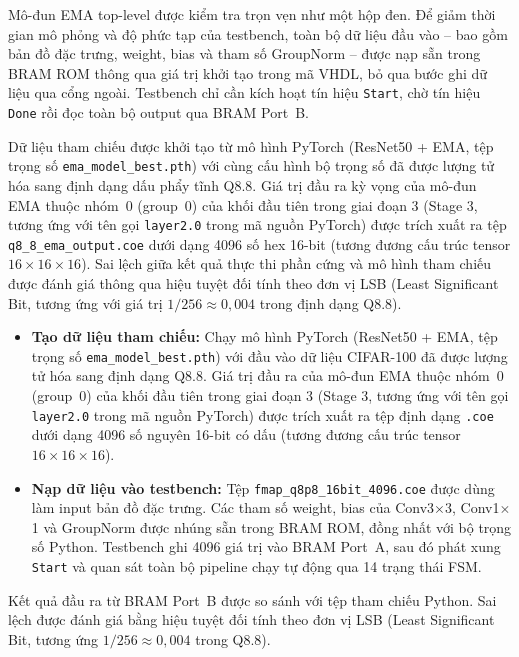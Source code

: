 \documentclass{uetgraduation}
\begin{document}
Mô-đun EMA top-level được kiểm tra trọn vẹn như một hộp đen. Để giảm thời gian
mô phỏng và độ phức tạp của testbench, toàn bộ dữ liệu đầu vào -- bao gồm
bản đồ đặc trưng, weight, bias và tham số GroupNorm -- được nạp sẵn trong BRAM ROM
thông qua giá trị khởi tạo trong mã VHDL, bỏ qua bước ghi dữ liệu qua cổng
ngoài. Testbench chỉ cần kích hoạt tín hiệu \texttt{Start}, chờ tín hiệu
\texttt{Done} rồi đọc toàn bộ output qua BRAM Port~B.

Dữ liệu tham chiếu được khởi tạo từ mô hình PyTorch (ResNet50 + EMA, tệp trọng số \texttt{ema\_model\_best.pth}) với cùng cấu hình bộ trọng số đã được lượng tử hóa sang định dạng dấu phẩy tĩnh Q8.8. Giá trị đầu ra kỳ vọng của mô-đun EMA thuộc nhóm~0 (group~0) của khối đầu tiên trong giai đoạn 3 (Stage 3, tương ứng với tên gọi \texttt{layer2.0} trong mã nguồn PyTorch) được trích xuất ra tệp \texttt{q8\_8\_ema\_output.coe} dưới dạng 4096 số hex 16-bit (tương đương cấu trúc tensor $16 \times 16 \times 16$). Sai lệch giữa kết quả thực thi phần cứng và mô hình tham chiếu được đánh giá thông qua hiệu tuyệt đối tính theo đơn vị LSB (Least Significant Bit, tương ứng với giá trị $1/256 \approx 0{,}004$ trong định dạng Q8.8).
\begin{itemize}
    \item \textbf{Tạo dữ liệu tham chiếu:} Chạy mô hình PyTorch (ResNet50 + EMA, tệp trọng số \texttt{ema\_model\_best.pth}) với đầu vào dữ liệu CIFAR-100 đã được lượng tử hóa sang định dạng Q8.8. Giá trị đầu ra của mô-đun EMA thuộc nhóm~0 (group~0) của khối đầu tiên trong giai đoạn 3 (Stage 3, tương ứng với tên gọi \texttt{layer2.0} trong mã nguồn PyTorch) được trích xuất ra tệp định dạng \texttt{.coe} dưới dạng 4096 số nguyên 16-bit có dấu (tương đương cấu trúc tensor $16 \times 16 \times 16$).

    \item \textbf{Nạp dữ liệu vào testbench:} Tệp
    \texttt{fmap\_q8p8\_16bit\_4096.coe} được dùng làm input bản đồ đặc trưng. Các tham số
    weight, bias của Conv3$\times$3, Conv1$\times$1 và GroupNorm được nhúng sẵn trong
    BRAM ROM, đồng nhất với bộ trọng số Python. Testbench ghi 4096 giá trị vào BRAM
    Port~A, sau đó phát xung \texttt{Start} và quan sát toàn bộ pipeline chạy tự động
    qua 14 trạng thái FSM.
\end{itemize}

Kết quả đầu ra từ BRAM Port~B được so sánh với tệp tham chiếu Python. Sai lệch
được đánh giá bằng hiệu tuyệt đối tính theo đơn vị LSB (Least Significant Bit,
tương ứng $1/256 \approx 0{,}004$ trong Q8.8).
\end{document}
